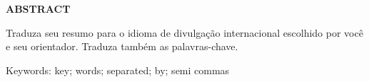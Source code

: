 \thispagestyle{empty}
\begin{center}
\textbf{\MakeUppercase{Abstract}}
\end{center}

\begin{spacing}{1.5}
Traduza seu resumo para o idioma de
divulgação internacional escolhido por você e seu orientador. Traduza também as palavras-chave.
\end{spacing}

\vspace{1em}

Keywords: key; words; separated; by; semi commas
\newpage
